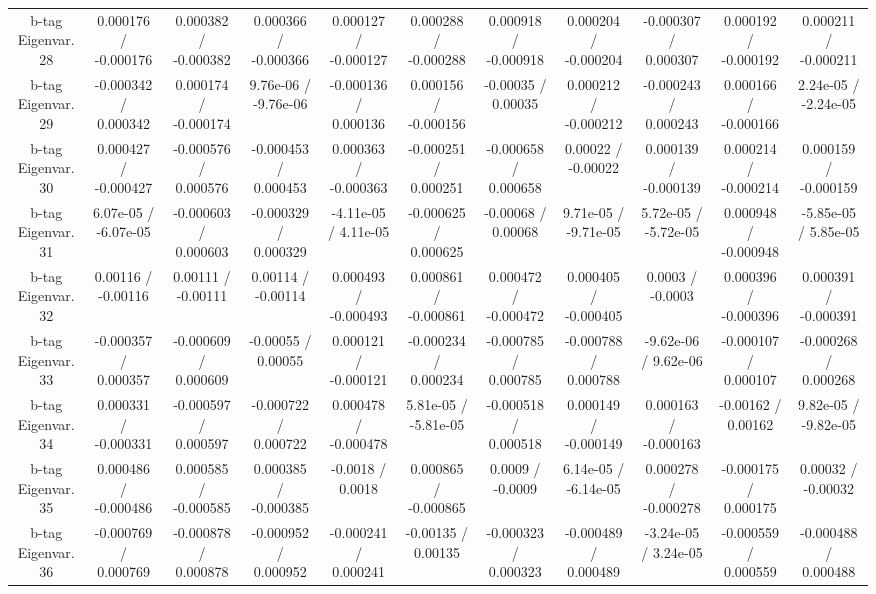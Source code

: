 \begin{table}[htbp]
\begin{center}
\begin{tabular}{|c|c|c|c|c|c|c|c|c|c|c|}
  b-tag Eigenvar. 28 & 0.000176 / -0.000176 & 0.000382 / -0.000382 & 0.000366 / -0.000366 & 0.000127 / -0.000127 & 0.000288 / -0.000288 & 0.000918 / -0.000918 & 0.000204 / -0.000204 & -0.000307 / 0.000307 & 0.000192 / -0.000192 & 0.000211 / -0.000211 \\ 
  b-tag Eigenvar. 29 & -0.000342 / 0.000342 & 0.000174 / -0.000174 & 9.76e-06 / -9.76e-06 & -0.000136 / 0.000136 & 0.000156 / -0.000156 & -0.00035 / 0.00035 & 0.000212 / -0.000212 & -0.000243 / 0.000243 & 0.000166 / -0.000166 & 2.24e-05 / -2.24e-05 \\ 
  b-tag Eigenvar. 30 & 0.000427 / -0.000427 & -0.000576 / 0.000576 & -0.000453 / 0.000453 & 0.000363 / -0.000363 & -0.000251 / 0.000251 & -0.000658 / 0.000658 & 0.00022 / -0.00022 & 0.000139 / -0.000139 & 0.000214 / -0.000214 & 0.000159 / -0.000159 \\ 
  b-tag Eigenvar. 31 & 6.07e-05 / -6.07e-05 & -0.000603 / 0.000603 & -0.000329 / 0.000329 & -4.11e-05 / 4.11e-05 & -0.000625 / 0.000625 & -0.00068 / 0.00068 & 9.71e-05 / -9.71e-05 & 5.72e-05 / -5.72e-05 & 0.000948 / -0.000948 & -5.85e-05 / 5.85e-05 \\ 
  b-tag Eigenvar. 32 & 0.00116 / -0.00116 & 0.00111 / -0.00111 & 0.00114 / -0.00114 & 0.000493 / -0.000493 & 0.000861 / -0.000861 & 0.000472 / -0.000472 & 0.000405 / -0.000405 & 0.0003 / -0.0003 & 0.000396 / -0.000396 & 0.000391 / -0.000391 \\ 
  b-tag Eigenvar. 33 & -0.000357 / 0.000357 & -0.000609 / 0.000609 & -0.00055 / 0.00055 & 0.000121 / -0.000121 & -0.000234 / 0.000234 & -0.000785 / 0.000785 & -0.000788 / 0.000788 & -9.62e-06 / 9.62e-06 & -0.000107 / 0.000107 & -0.000268 / 0.000268 \\ 
  b-tag Eigenvar. 34 & 0.000331 / -0.000331 & -0.000597 / 0.000597 & -0.000722 / 0.000722 & 0.000478 / -0.000478 & 5.81e-05 / -5.81e-05 & -0.000518 / 0.000518 & 0.000149 / -0.000149 & 0.000163 / -0.000163 & -0.00162 / 0.00162 & 9.82e-05 / -9.82e-05 \\ 
  b-tag Eigenvar. 35 & 0.000486 / -0.000486 & 0.000585 / -0.000585 & 0.000385 / -0.000385 & -0.0018 / 0.0018 & 0.000865 / -0.000865 & 0.0009 / -0.0009 & 6.14e-05 / -6.14e-05 & 0.000278 / -0.000278 & -0.000175 / 0.000175 & 0.00032 / -0.00032 \\ 
  b-tag Eigenvar. 36 & -0.000769 / 0.000769 & -0.000878 / 0.000878 & -0.000952 / 0.000952 & -0.000241 / 0.000241 & -0.00135 / 0.00135 & -0.000323 / 0.000323 & -0.000489 / 0.000489 & -3.24e-05 / 3.24e-05 & -0.000559 / 0.000559 & -0.000488 / 0.000488 \\ 

\end{tabular}
\end{center}
\end{table}
